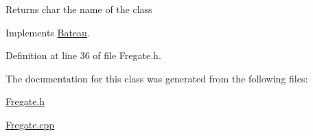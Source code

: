 \begin{DoxyReturn}{Returns}
char the name of the class 
\end{DoxyReturn}


Implements \hyperlink{class_bateau_ad6775916a45ddbe18a9f06df79e2ba6f}{Bateau}.



Definition at line 36 of file Fregate.h.



The documentation for this class was generated from the following files:\begin{DoxyCompactItemize}
\item 
\hyperlink{_fregate_8h}{Fregate.h}\item 
\hyperlink{_fregate_8cpp}{Fregate.cpp}\end{DoxyCompactItemize}
